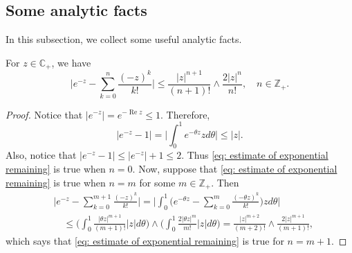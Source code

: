 \subsection{Some analytic facts}
    In this subsection, we collect some useful analytic facts.
\begin{lem}
\label{lem: estimate of exponential remaining}
    For $z\in \mathbb C_+$,  we have
\begin{equation}
\label{eq: estimate of exponential remaining}
    \Big|e^{-z} - \sum_{k=0}^n \frac{(-z)^k}{k!} \Big|
    \leq \frac{|z|^{n+1}}{(n+1)!} \wedge \frac{2|z|^{n}}{n!}, \quad n\in \mathbb Z_+.
\end{equation}
\end{lem}
\begin{proof}
    Notice that $|e^{-z}| = e^{- \operatorname{Re} z} \leq 1$.
    Therefore,
\begin{equation}
    |e^{-z} - 1|
    = \Big| \int_0^1 e^{-\theta z} z d\theta\Big|
    \leq |z|.
\end{equation}
    Also, notice that $|e^{-z} - 1| \leq |e^{-z}|+1 \leq 2$.
    Thus \eqref{eq: estimate of exponential remaining} is true when $n = 0$.
    Now, suppose that \eqref{eq: estimate of exponential remaining} is true when $n = m$ for some $m \in \mathbb Z_+$.
    Then
\begin{align}
    &\Big|e^{-z} - \sum_{k=0}^{m+1} \frac{(-z)^k}{k!}\Big|
    = \Big| \int_0^1\Big(e^{-\theta z} - \sum_{k=0}^m \frac{(-\theta z)^k}{k!} \Big) z d\theta \Big|
    \\&\quad \leq  \Big(\int_0^1 \frac{|\theta z|^{m+1}}{(m+1)!} |z| d\theta\Big) \wedge \Big(\int_0^1 \frac{2|\theta z|^{m}}{m!} |z| d\theta\Big)
    = \frac{|z|^{m+2}}{(m+2)!} \wedge \frac{2|z|^{m+1}}{(m+1)!},
\end{align}
    which says that \eqref{eq: estimate of exponential remaining} is true for $n = m + 1$.
\end{proof}


